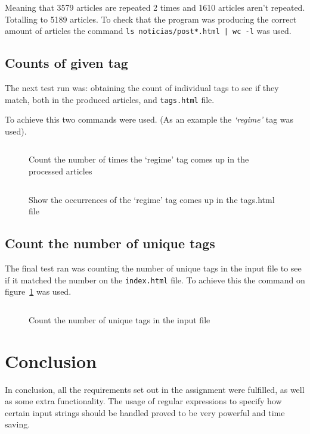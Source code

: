 \documentclass[a4paper]{report}
\begin{document}
Meaning that 3579 articles are repeated 2 times and 1610 articles aren't repeated. Totalling to 5189 articles. To check that the program was producing the correct amount of articles the command \verb!ls noticias/post*.html | wc -l! was used.

\section{Counts of given tag}

The next test run was: obtaining the count of individual tags to see if they match, both in the produced articles, and \texttt{tags.html} file.

To achieve this two commands were used. (As an example the \textit{`regime'} tag was used).

\begin{figure}[H]
    \inputminted{bash}{./test_count_regime_posts.sh}
    \caption{Count the number of times the `regime' tag comes up in the
    processed articles}
\end{figure}

\begin{figure}[H]
    \inputminted{bash}{./test_count_regime_tags.sh}
    \caption{Show the occurrences of the `regime' tag comes up in the tags.html
    file}
\end{figure}

\section{Count the number of unique tags}

The final test ran was counting the number of unique tags in the input file to see if it matched the number on the \texttt{index.html} file. To achieve this the command on figure~\ref{fig:test_count_unique_tags} was used.

\begin{figure}[H]
    \inputminted{bash}{test_count_unique_tags.sh}
    \caption{Count the number of unique tags in the input file}\label{fig:test_count_unique_tags}
\end{figure}

\chapter{Conclusion}

In conclusion, all the requirements set out in the assignment were fulfilled, as
well as some extra functionality. The usage of regular expressions to specify
how certain input strings should be handled proved to be very powerful and time
saving.
\end{document}
